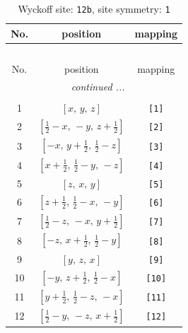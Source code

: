 \documentclass[fleqn,8pt]{jsarticle}
\begin{document}
\begin{longtable}{ccc}
\caption{Wyckoff site: {\tt 12b}, site symmetry: {\tt 1}}
 \\
 \hline \hline
No. & position & mapping \\ \hline \endfirsthead

\multicolumn{2}{l}{\tablename\ \thetable{}} \\
 \hline \hline
No. & position & mapping \\ \hline \endhead

 \hline \hline
\multicolumn{2}{r}{\footnotesize\it continued ...} \\ \endfoot

 \hline \hline
\multicolumn{2}{r}{} \\ \endlastfoot

1 & $\left[ x,\, y,\, z \right]$ & {\tt [1]} \\ \hline
2 & $\left[ \frac{1}{2} - x,\, - y,\, z + \frac{1}{2} \right]$ & {\tt [2]} \\ \hline
3 & $\left[ - x,\, y + \frac{1}{2},\, \frac{1}{2} - z \right]$ & {\tt [3]} \\ \hline
4 & $\left[ x + \frac{1}{2},\, \frac{1}{2} - y,\, - z \right]$ & {\tt [4]} \\ \hline
5 & $\left[ z,\, x,\, y \right]$ & {\tt [5]} \\ \hline
6 & $\left[ z + \frac{1}{2},\, \frac{1}{2} - x,\, - y \right]$ & {\tt [6]} \\ \hline
7 & $\left[ \frac{1}{2} - z,\, - x,\, y + \frac{1}{2} \right]$ & {\tt [7]} \\ \hline
8 & $\left[ - z,\, x + \frac{1}{2},\, \frac{1}{2} - y \right]$ & {\tt [8]} \\ \hline
9 & $\left[ y,\, z,\, x \right]$ & {\tt [9]} \\ \hline
10 & $\left[ - y,\, z + \frac{1}{2},\, \frac{1}{2} - x \right]$ & {\tt [10]} \\ \hline
11 & $\left[ y + \frac{1}{2},\, \frac{1}{2} - z,\, - x \right]$ & {\tt [11]} \\ \hline
12 & $\left[ \frac{1}{2} - y,\, - z,\, x + \frac{1}{2} \right]$ & {\tt [12]} \\
\end{longtable}
\end{document}
